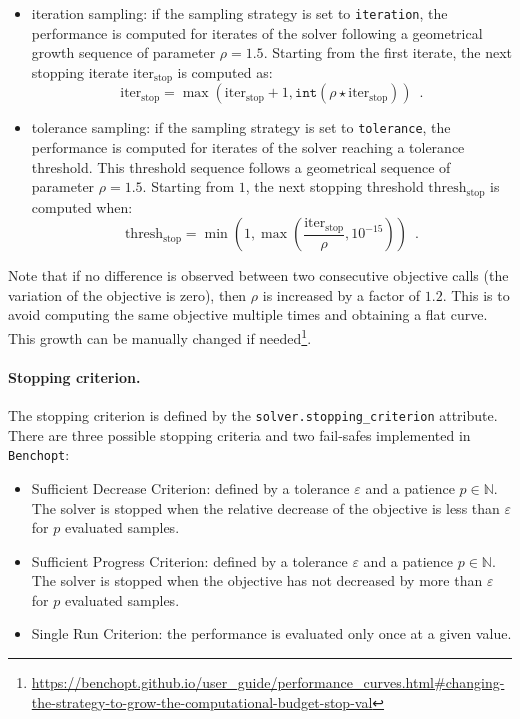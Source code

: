 \begin{itemize}
    \item iteration sampling: if the sampling strategy is set to \texttt{iteration}, the performance is computed for iterates of the solver following a geometrical growth sequence of parameter $\rho=1.5$. Starting from the first iterate, the next stopping iterate $\text{iter}_\text{stop}$ is computed as:
    \[\text{iter}_\text{stop} = \max(\text{iter}_\text{stop} + 1 , \texttt{int}(\rho \star \text{iter}_\text{stop})) \enspace.\]
    \item tolerance sampling: if the sampling strategy is set to \texttt{tolerance}, the performance is computed for iterates of the solver reaching a tolerance threshold. This threshold sequence follows a geometrical sequence of parameter $\rho=1.5$. Starting from $1$, the next stopping threshold $\text{thresh}_\text{stop}$ is computed when:
    \[\text{thresh}_\text{stop} = \min\left(1, \max\left(\frac{\text{iter}_\text{stop}}{\rho}, 10^{-15}\right)\right) \enspace.\]
\end{itemize}

Note that if no difference is observed between two consecutive objective calls (the variation of the objective is zero), then $\rho$ is increased by a factor of $1.2$. This is to avoid computing the same objective multiple times and obtaining a flat curve. This growth can be manually changed if needed\footnote{\url{https://benchopt.github.io/user\_guide/performance\_curves.html\#changing-the-strategy-to-grow-the-computational-budget-stop-val}}.

\paragraph{Stopping criterion.}
The stopping criterion is defined by the \texttt{solver.stopping\_criterion} attribute.
There are three possible stopping criteria and two fail-safes implemented in \texttt{Benchopt}:
\begin{itemize}
    \item Sufficient Decrease Criterion: defined by a tolerance $\varepsilon$ and a patience $p\in\mathbb{N}$. The solver is stopped when the relative decrease of the objective is less than $\varepsilon$ for $p$ evaluated samples.
    \item Sufficient Progress Criterion: defined by a tolerance $\varepsilon$ and a patience $p\in\mathbb{N}$. The solver is stopped when the objective has not decreased by more than $\varepsilon$ for $p$ evaluated samples.
    \item Single Run Criterion: the performance is evaluated only once at a given value.
\end{itemize}


